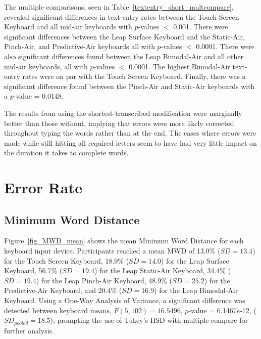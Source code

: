 The multiple comparisons, seen in Table~\ref{textentry_short_multcompare}, revealed significant differences in text-entry rates between the Touch Screen Keyboard and all mid-air keyboards with $p$-values $<$ 0.001. There were significant differences between the Leap Surface Keyboard and the Static-Air, Pinch-Air, and Predictive-Air keyboards all with $p$-values $<$ 0.0001. There were also significant differences found between the Leap Bimodal-Air and all other mid-air keyboards, all with $p$-values $<$ 0.0001. The highest Bimodal-Air text-entry rates were on par with the Touch Screen Keyboard. Finally, there was a significant difference found between the Pinch-Air and Static-Air keyboards with a $p$-value = 0.0148.

The results from using the shortest-transcribed modification were marginally better than those without, implying that errors were more likely corrected throughout typing the words rather than at the end. The cases where errors were made while still hitting all required letters seem to have had very little impact on the duration it takes to complete words.

\section{Error Rate}

\subsection{Minimum Word Distance}
Figure~\ref{fig_MWD_mean} shows the mean Minimum Word Distance for each keyboard input device. Participants reached a mean MWD of 13.0\% ($SD = 13.4$) for the Touch Screen Keyboard, 18.9\% ($SD = 14.0$) for the Leap Surface Keyboard, 56.7\% ($SD = 19.4$) for the Leap Static-Air Keyboard, 34.4\% ($SD = 19.4$) for the Leap Pinch-Air Keyboard, 48.9\% ($SD = 25.2$) for the Predictive-Air Keyboard, and 20.4\% ($SD = 16.9$) for the Leap Bimodal-Air Keyboard. Using a One-Way Analysis of Variance, a significant difference was detected between keyboard means, $F(5, 102) = 16.5496$, $p$-value = 6.1467$e$-12, ($SD_{pooled} = 18.5$), prompting the use of Tukey's HSD with multiple-compare for further analysis.

